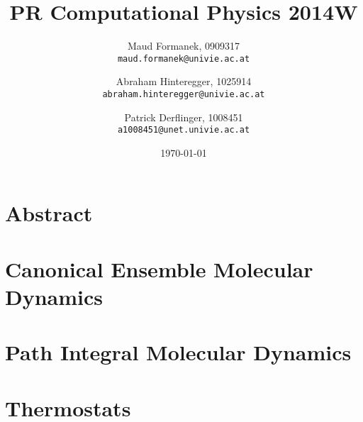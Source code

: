 \documentclass[a4paper]{article}
\title{PR Computational Physics 2014W}
\author{
	Maud Formanek, 0909317\\
    \texttt{maud.formanek@univie.ac.at}
	\and
    Abraham Hinteregger,  1025914\\
    \texttt{abraham.hinteregger@univie.ac.at}\and
    Patrick Derflinger,  1008451\\
    \texttt{a1008451@unet.univie.ac.at}
    }
\date{\today}
\begin{document}
\maketitle
\tableofcontents

\newpage

\section{Abstract}

\section{Canonical Ensemble Molecular Dynamics}

\section{Path Integral Molecular Dynamics}

\section{Thermostats}







\end{document}
